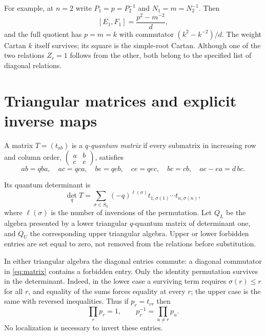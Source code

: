 \documentclass[11pt]{article}
\theoremstyle{definition}
\theoremstyle{remark}
\begin{document}
For example, at $n=2$ write $P_1=p=P_2^{-1}$ and $N_1=m=N_2^{-1}$. Then
\[
 [E_1,F_1]=\frac{p^2-m^{-2}}d,
\]
and the full quotient has $p=m=k$ with commutator $(k^2-k^{-2})/d$. The weight Cartan $k$ itself survives; its square is the simple-root Cartan. Although one of the two relations $Z_r=1$ follows from the other, both belong to the specified list of diagonal relations.

\section{Triangular matrices and explicit inverse maps}\label{sec:matrices}

A matrix $T=(t_{ab})$ is a \emph{$q$-quantum matrix} if every submatrix in increasing row and column order,
$\left(\begin{smallmatrix}a&b\\c&e\end{smallmatrix}\right)$, satisfies
\begin{equation}\label{eq:matrix}
 ab=qba,\quad ac=qca,\quad be=qeb,\quad ce=qec,\quad bc=cb,\quad ae-ea=d\,bc.
\end{equation}

Its quantum determinant is
\[
 \det_qT=\sum_{\sigma\in S_n}(-q)^{\ell(\sigma)}t_{1,\sigma(1)}\cdots t_{n,\sigma(n)},
\]
where $\ell(\sigma)$ is the number of inversions of the permutation. Let $Q_L$ be the algebra presented by a lower triangular $q$-quantum matrix of determinant one, and $Q_U$ the corresponding upper triangular algebra. Upper or lower forbidden entries are set equal to zero, not removed from the relations before substitution.

In either triangular algebra the diagonal entries commute: a diagonal commutator in \eqref{eq:matrix} contains a forbidden entry. Only the identity permutation survives in the determinant. Indeed, in the lower case a surviving term requires $\sigma(r)\leq r$ for all $r$, and equality of the sums forces equality at every $r$; the upper case is the same with reversed inequalities. Thus if $p_r=t_{rr}$ then
\begin{equation}\label{eq:diag-inverse}
 \prod_rp_r=1,\qquad p_r^{-1}=\prod_{u\ne r}p_u.
\end{equation}
No localization is necessary to invert these entries.
\end{document}
